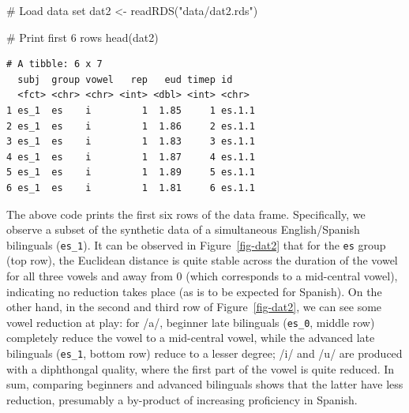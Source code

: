 \documentclass[
  letterpaper,
  DIV=11,
  numbers=noendperiod]{scrartcl}
\newenvironment{Shaded}{\begin{snugshade}}{\end{snugshade}}
\newcommand{\CommentTok}[1]{\textcolor[rgb]{0.37,0.37,0.37}{#1}}
\newcommand{\FunctionTok}[1]{\textcolor[rgb]{0.28,0.35,0.67}{#1}}
\newcommand{\NormalTok}[1]{\textcolor[rgb]{0.00,0.23,0.31}{#1}}
\newcommand{\OtherTok}[1]{\textcolor[rgb]{0.00,0.23,0.31}{#1}}
\newcommand{\StringTok}[1]{\textcolor[rgb]{0.13,0.47,0.30}{#1}}
\begin{document}
\begin{Shaded}
\begin{Highlighting}[]
\CommentTok{\# Load data set}
\NormalTok{dat2 }\OtherTok{\textless{}{-}} \FunctionTok{readRDS}\NormalTok{(}\StringTok{"data/dat2.rds"}\NormalTok{)}

\CommentTok{\# Print first 6 rows}
\FunctionTok{head}\NormalTok{(dat2)}
\end{Highlighting}
\end{Shaded}

\begin{verbatim}
# A tibble: 6 x 7
  subj  group vowel   rep   eud timep id    
  <fct> <chr> <chr> <int> <dbl> <int> <chr> 
1 es_1  es    i         1  1.85     1 es.1.1
2 es_1  es    i         1  1.86     2 es.1.1
3 es_1  es    i         1  1.83     3 es.1.1
4 es_1  es    i         1  1.87     4 es.1.1
5 es_1  es    i         1  1.89     5 es.1.1
6 es_1  es    i         1  1.81     6 es.1.1
\end{verbatim}

The above code prints the first six rows of the data frame.
Specifically, we observe a subset of the synthetic data of a
simultaneous English/Spanish bilinguals (\texttt{es\_1}). It can be
observed in Figure~\ref{fig-dat2} that for the \texttt{es} group (top
row), the Euclidean distance is quite stable across the duration of the
vowel for all three vowels and away from 0 (which corresponds to a
mid-central vowel), indicating no reduction takes place (as is to be
expected for Spanish). On the other hand, in the second and third row of
Figure~\ref{fig-dat2}, we can see some vowel reduction at play: for /a/,
beginner late bilinguals (\texttt{es\_0}, middle row) completely reduce
the vowel to a mid-central vowel, while the advanced late bilinguals
(\texttt{es\_1}, bottom row) reduce to a lesser degree; /i/ and /u/ are
produced with a diphthongal quality, where the first part of the vowel
is quite reduced. In sum, comparing beginners and advanced bilinguals
shows that the latter have less reduction, presumably a by-product of
increasing proficiency in Spanish.
\end{document}
